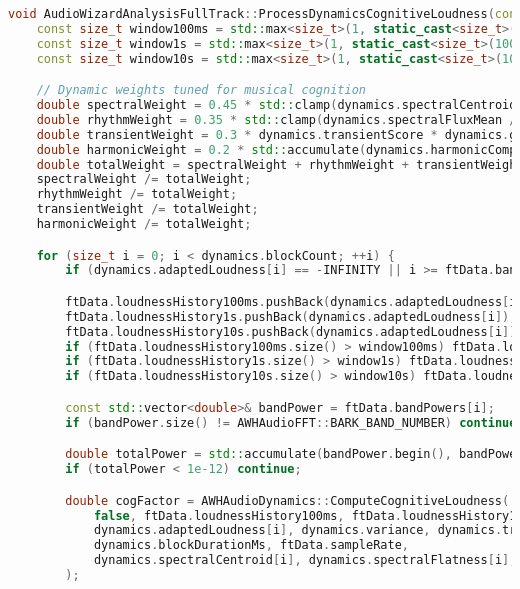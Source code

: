 \documentclass[11pt]{article}
\begin{document}
\begin{lstlisting}[language=C++]
void AudioWizardAnalysisFullTrack::ProcessDynamicsCognitiveLoudness(const FullTrackData& ftData, FullTrackDataDynamics& dynamics) {
	const size_t window100ms = std::max<size_t>(1, static_cast<size_t>(100.0 / dynamics.blockDurationMs));
	const size_t window1s = std::max<size_t>(1, static_cast<size_t>(1000.0 / dynamics.blockDurationMs));
	const size_t window10s = std::max<size_t>(1, static_cast<size_t>(10000.0 / dynamics.blockDurationMs));

	// Dynamic weights tuned for musical cognition
	double spectralWeight = 0.45 * std::clamp(dynamics.spectralCentroidMean / 12000.0, 0.0, 1.0) * dynamics.genreFactor;
	double rhythmWeight = 0.35 * std::clamp(dynamics.spectralFluxMean / 0.15, 0.0, 1.0) * (1.0 - dynamics.genreFactor);
	double transientWeight = 0.3 * dynamics.transientScore * dynamics.genreFactor;
	double harmonicWeight = 0.2 * std::accumulate(dynamics.harmonicComplexityFactor.begin(), dynamics.harmonicComplexityFactor.end(), 0.0) / dynamics.blockCount;
	double totalWeight = spectralWeight + rhythmWeight + transientWeight + harmonicWeight + 0.1;
	spectralWeight /= totalWeight;
	rhythmWeight /= totalWeight;
	transientWeight /= totalWeight;
	harmonicWeight /= totalWeight;

	for (size_t i = 0; i < dynamics.blockCount; ++i) {
		if (dynamics.adaptedLoudness[i] == -INFINITY || i >= ftData.bandPowers.size()) continue;

		ftData.loudnessHistory100ms.pushBack(dynamics.adaptedLoudness[i]);
		ftData.loudnessHistory1s.pushBack(dynamics.adaptedLoudness[i]);
		ftData.loudnessHistory10s.pushBack(dynamics.adaptedLoudness[i]);
		if (ftData.loudnessHistory100ms.size() > window100ms) ftData.loudnessHistory100ms.trim(window100ms);
		if (ftData.loudnessHistory1s.size() > window1s) ftData.loudnessHistory1s.trim(window1s);
		if (ftData.loudnessHistory10s.size() > window10s) ftData.loudnessHistory10s.trim(window10s);

		const std::vector<double>& bandPower = ftData.bandPowers[i];
		if (bandPower.size() != AWHAudioFFT::BARK_BAND_NUMBER) continue;

		double totalPower = std::accumulate(bandPower.begin(), bandPower.end(), 0.0);
		if (totalPower < 1e-12) continue;

		double cogFactor = AWHAudioDynamics::ComputeCognitiveLoudness(
			false, ftData.loudnessHistory100ms, ftData.loudnessHistory1s, ftData.loudnessHistory10s,
			dynamics.adaptedLoudness[i], dynamics.variance, dynamics.transientBoosts, bandPower,
			dynamics.blockDurationMs, ftData.sampleRate,
			dynamics.spectralCentroid[i], dynamics.spectralFlatness[i], dynamics.spectralFlux[i], dynamics.genreFactor
		);


\end{lstlisting}
\end{document}
